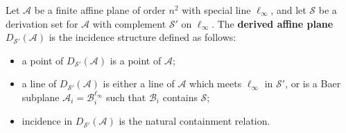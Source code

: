 Let $\mathcal{A}$ be a finite affine plane of order $n^2$ with special line $\ell_{\infty}$, and let $\mathcal{S}$ be a derivation set for $\mathcal{A}$ with complement $\mathcal{S}'$ on $\ell_{\infty}$. The \textbf{derived affine plane} $D_{\mathcal{S}'}(\mathcal{A})$ is the incidence structure defined as follows:
\begin{itemize}
\item a point of $D_{\mathcal{S}'}(\mathcal{A})$ is a point of $\mathcal{A}$;
\item a line of $D_{\mathcal{S}'}(\mathcal{A})$ is either a line of $\mathcal{A}$ which meets $\ell_{\infty}$ in $\mathcal{S}'$, or is a Baer subplane $\mathcal{A}_i = \mathcal{B}_i^{\ell_{\infty}}$ such that $\mathcal{B}_i$ contains $\mathcal{S}$;
\item incidence in $D_{\mathcal{S}'}(\mathcal{A})$ is the natural containment relation.
\end{itemize}
